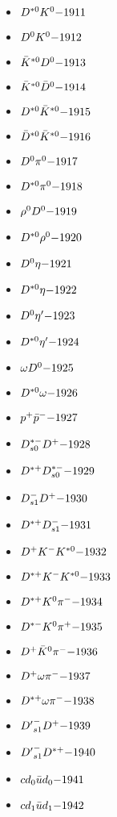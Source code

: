 \begin{multicols}{3}
\begin{itemize}
 \item $ D^{*0} K^{0} \hfill{-1911}$
 \item $ D^{0} K^{0} \hfill{-1912}$
 \item $ \bar{K}^{*0} D^{0} \hfill{-1913}$
 \item $ \bar{K}^{*0} \bar{D}^{0} \hfill{-1914}$
 \item $ D^{*0} \bar{K}^{*0} \hfill{-1915}$
 \item $ \bar{D}^{*0} \bar{K}^{*0} \hfill{-1916}$
 \item $ D^{0} \pi^{0} \hfill{-1917}$
 \item $ D^{*0} \pi^{0} \hfill{-1918}$
 \item $ \rho^{0} D^{0} \hfill{-1919}$
 \item $ D^{*0} \rho^{0} \hfill{-1920}$
 \item $ D^{0} \eta \hfill{-1921}$
 \item $ D^{*0} \eta \hfill{-1922}$
 \item $ D^{0} {\eta^{\prime}} \hfill{-1923}$
 \item $ D^{*0} {\eta^{\prime}} \hfill{-1924}$
 \item $ \omega D^{0} \hfill{-1925}$
 \item $ D^{*0} \omega \hfill{-1926}$
 \item $ p^{+} \bar{p}^{-} \hfill{-1927}$
 \item $ D_{s0}^{*-} D^{+} \hfill{-1928}$
 \item $ D^{*+} D_{s0}^{*-} \hfill{-1929}$
 \item $ D_{s1}^{-} D^{+} \hfill{-1930}$
 \item $ D^{*+} D_{s1}^{-} \hfill{-1931}$
 \item $ D^{+} K^{-} K^{*0} \hfill{-1932}$
 \item $ D^{*+} K^{-} K^{*0} \hfill{-1933}$
 \item $ D^{*+} K^{0} \pi^{-} \hfill{-1934}$
 \item $ D^{*-} K^{0} \pi^{+} \hfill{-1935}$
 \item $ D^{+} \bar{K}^{0} \pi^{-} \hfill{-1936}$
 \item $ D^{+} \omega \pi^{-} \hfill{-1937}$
 \item $ D^{*+} \omega \pi^{-} \hfill{-1938}$
 \item $ {D^{\prime}}_{s1}^{-} D^{+} \hfill{-1939}$
 \item $ {D^{\prime}}_{s1}^{-} D^{*+} \hfill{-1940}$
 \item $ cd_{0} \bar{u}d_{0} \hfill{-1941}$
 \item $ cd_{1} \bar{u}d_{1} \hfill{-1942}$

\end{itemize}
\end{multicols}

